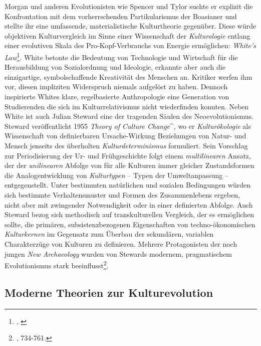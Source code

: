 \documentclass[openany,twoside,twocolumn]{book}
\let\rmarkdownfootnote\footnote%
\def\footnote{\protect\rmarkdownfootnote}
\begin{document}
Morgan und anderen Evolutionisten wie Spencer und Tylor suchte er
explizit die Konfrontation mit dem vorherrschenden Partikularismus der
Boasianer und stellte ihr eine umfassende, materialistische
Kulturtheorie gegenüber. Diese würde objektiven Kulturvergleich im Sinne
einer Wissenschaft der \emph{Kulturologie} entlang einer evolutiven
Skala des Pro-Kopf-Verbrauchs von Energie ermöglichen: \emph{White's
Law}\footnote{\textcite{white_energy_1943},
  \textcite{white_science_1949}}. White betonte die Bedeutung von
Technologie und Wirtschaft für die Herausbildung von Sozialordnung und
Ideologie, erkannte aber auch die einzigartige, symbolschaffende
Kreativität des Menschen an. Kritiker werfen ihm vor, diesen impliziten
Widerspruch niemals aufgelöst zu haben. Dennoch inspirierte Whites
klare, regelbasierte Anthropologie eine Generation von Studierenden die
sich im Kulturrelativismus nicht wiederfinden konnten. Neben White ist
auch Julian Steward eine der tragenden Säulen des Neoevolutionismus.
Steward veröffentlicht 1955 \emph{Theory of Culture Change}\^{}, wo er
\emph{Kulturökologie} als Wissenschaft von definierbaren Ursache-Wirkung
Beziehungen von Natur- und Mensch jenseits des überholten
\emph{Kulturdeterminismus} formuliert. Sein Vorschlag zur Periodisierung
der Ur- und Frühgeschichte folgt einem \emph{multilinearen} Ansatz, der
der \emph{unilinearen} Abfolge von für alle Kulturen immer gleicher
Zustandsformen die Analogentwicklung von \emph{Kulturtypen} -- Typen der
Umweltanpassung -- entgegenstellt. Unter bestimmten natürlichen und
sozialen Bedingungen würden sich bestimmte Verhaltensmuster und Formen
des Zusammenlebens ergeben, nicht aber mit zwingender Notwendigkeit oder
in einer definierten Abfolge. Auch Steward bezog sich methodisch auf
transkulturellen Vergleich, der es ermöglichen sollte, die primären,
subsistenzbezogenen Eigenschaften von techno-ökonomischen
\emph{Kulturkernen} im Gegensatz zum Überbau der sekundären, variablen
Charakterzüge von Kulturen zu definieren. Mehrere Protagonisten der noch
jungen \emph{New Archaeology} wurden von Stewards modernem,
pragmatischem Evolutionismus stark beeinflusst\footnote{\textcite{petermann_geschichte_2004},
  734-761.}.

\hypertarget{evolutionism-modern-theories}{%
\subsection{Moderne Theorien zur
Kulturevolution}\label{evolutionism-modern-theories}}
\end{document}
